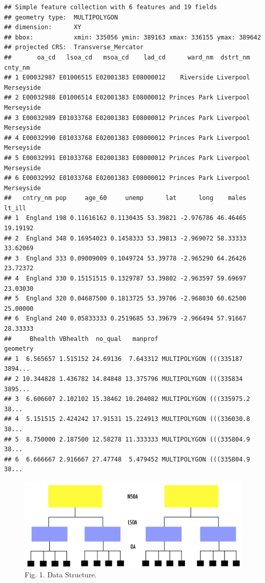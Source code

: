 \documentclass[
]{book}
\begin{document}
\begin{verbatim}
## Simple feature collection with 6 features and 19 fields
## geometry type:  MULTIPOLYGON
## dimension:      XY
## bbox:           xmin: 335056 ymin: 389163 xmax: 336155 ymax: 389642
## projected CRS:  Transverse_Mercator
##       oa_cd   lsoa_cd   msoa_cd    lad_cd      ward_nm  dstrt_nm    cnty_nm
## 1 E00032987 E01006515 E02001383 E08000012    Riverside Liverpool Merseyside
## 2 E00032988 E01006514 E02001383 E08000012 Princes Park Liverpool Merseyside
## 3 E00032989 E01033768 E02001383 E08000012 Princes Park Liverpool Merseyside
## 4 E00032990 E01033768 E02001383 E08000012 Princes Park Liverpool Merseyside
## 5 E00032991 E01033768 E02001383 E08000012 Princes Park Liverpool Merseyside
## 6 E00032992 E01033768 E02001383 E08000012 Princes Park Liverpool Merseyside
##   cntry_nm pop     age_60     unemp      lat      long    males   lt_ill
## 1  England 198 0.11616162 0.1130435 53.39821 -2.976786 46.46465 19.19192
## 2  England 348 0.16954023 0.1458333 53.39813 -2.969072 58.33333 33.62069
## 3  England 333 0.09009009 0.1049724 53.39778 -2.965290 64.26426 23.72372
## 4  England 330 0.15151515 0.1329787 53.39802 -2.963597 59.69697 23.03030
## 5  England 320 0.04687500 0.1813725 53.39706 -2.968030 60.62500 25.00000
## 6  England 240 0.05833333 0.2519685 53.39679 -2.966494 57.91667 28.33333
##     Bhealth VBhealth  no_qual   manprof                       geometry
## 1  6.565657 1.515152 24.69136  7.643312 MULTIPOLYGON (((335187 3894...
## 2 10.344828 1.436782 14.84848 13.375796 MULTIPOLYGON (((335834 3895...
## 3  6.606607 2.102102 15.38462 10.204082 MULTIPOLYGON (((335975.2 38...
## 4  5.151515 2.424242 17.91531 15.224913 MULTIPOLYGON (((336030.8 38...
## 5  8.750000 2.187500 12.58278 11.333333 MULTIPOLYGON (((335804.9 38...
## 6  6.666667 2.916667 27.47748  5.479452 MULTIPOLYGON (((335804.9 38...
\end{verbatim}

\begin{figure}
\centering
\includegraphics{figs/ch5/datastr.png}
\caption{Fig. 1. Data Structure.}
\end{figure}
\end{document}
